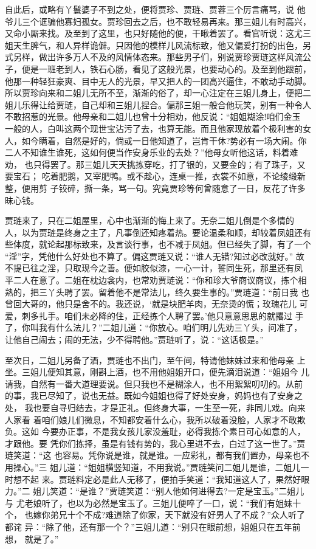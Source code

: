 自此后，或略有丫鬟婆子不到之处，便将贾珍、贾琏、贾蓉三个厉言痛骂，说
他爷儿三个诓骗他寡妇孤女。贾珍回去之后，也不敢轻易再来。那三姐儿有时高兴，
又命小厮来找。及至到了这里，也只好随他的便，干瞅着罢了。看官听说：这尤三
姐天生脾气，和人异样诡僻。只因他的模样儿风流标致，他又偏爱打扮的出色，另
式另样，做出许多万人不及的风情体态来。那些男子们，别说贾珍贾琏这样风流公
子，便是一班老到人，铁石心肠，看见了这般光景，也要动心的。及至到他跟前，
他那一种轻狂豪爽、目中无人的光景，早又把人的一团高兴逼住，不敢动手动脚。
所以贾珍向来和二姐儿无所不至，渐渐的俗了，却一心注定在三姐儿身上，便把二
姐儿乐得让给贾琏，自己却和三姐儿捏合。偏那三姐一般合他玩笑，别有一种令人
不敢招惹的光景。他母亲和二姐儿也曾十分相劝，他反说：“姐姐糊涂!咱们金玉
一般的人，白叫这两个现世宝沾污了去，也算无能。而且他家现放着个极利害的女
人，如今瞒着，自然是好的，倘或一日他知道了，岂肯干休?势必有一场大闹。你
二人不知谁生谁死，这如何便当作安身乐业的去处？”他母女听他这话，料着难劝，
也只得罢了。那三姐儿天天挑拣穿吃，打了银的，又要金的；有了珠子，又要宝石；
吃着肥鹅，又宰肥鸭。或不趁心，连桌一推，衣裳不如意，不论绫缎新整，便用剪
子铰碎，撕一条，骂一句。究竟贾珍等何曾随意了一日，反花了许多昧心钱。

贾琏来了，只在二姐屋里，心中也渐渐的悔上来了。无奈二姐儿倒是个多情的
人，以为贾琏是终身之主了，凡事倒还知疼着热。要论温柔和顺，却较着凤姐还有
些体度，就论起那标致来，及言谈行事，也不减于凤姐。但已经失了脚，有了一个
“淫”字，凭他什么好处也不算了。偏这贾琏又说：“谁人无错?知过必改就好。”
故不提已往之淫，只取现今之善。便如胶似漆，一心一计，誓同生死，那里还有凤
平二人在意了。二姐在枕边衾内，也常劝贾琏说：“你和珍大爷商议商议，拣个相
熟的，把三丫头聘了罢。留着他不是常法儿，终久要生事的。”贾琏道：“前日我
也曾回大哥的，他只是舍不的。我还说，‘就是块肥羊肉，无奈烫的慌；玫瑰花儿
可爱，刺多扎手。咱们未必降的住，正经拣个人聘了罢。’他只意意思思的就撂过
手了，你叫我有什么法儿？”二姐儿道：“你放心。咱们明儿先劝三丫头，问准了，
让他自己闹去；闹的无法，少不得聘他。”贾琏听了，说：“这话极是。”

至次日，二姐儿另备了酒，贾琏也不出门，至午间，特请他妹妹过来和他母亲
上坐。三姐儿便知其意，刚斟上酒，也不用他姐姐开口，便先滴泪说道：“姐姐今
儿请我，自然有一番大道理要说。但只我也不是糊涂人，也不用絮絮叨叨的。从前
的事，我已尽知了，说也无益。既如今姐姐也得了好处安身，妈妈也有了安身之处，
我也要自寻归结去，才是正礼。但终身大事，一生至一死，非同儿戏。向来人家看
着咱们娘儿们微息，不知都安着什么心，我所以破着没脸，人家才不敢欺负。这如
今要办正事，不是我女孩儿家没羞耻，必得我拣个素日可心如意的人，才跟他。要
凭你们拣择，虽是有钱有势的，我心里进不去，白过了这一世了。”贾琏笑道：“这
也容易。凭你说是谁，就是谁。一应彩礼，都有我们置办，母亲也不用操心。”三
姐儿道：“姐姐横竖知道，不用我说。”贾琏笑问二姐儿是谁，二姐儿一时想不起
来。贾琏料定必是此人无移了，便拍手笑道：“我知道这人了，果然好眼力。”二
姐儿笑道：“是谁？”贾琏笑道：“别人他如何进得去?一定是宝玉。”二姐儿与
尤老娘听了，也以为必然是宝玉了。三姐儿便啐了一口，说：“我们有姐妹十个，
也嫁你弟兄十个不成?难道除了你家，天下就没有好男人了不成？”众人听了都诧
异：“除了他，还有那一个？”三姐儿道：“别只在眼前想，姐姐只在五年前想，
就是了。”


